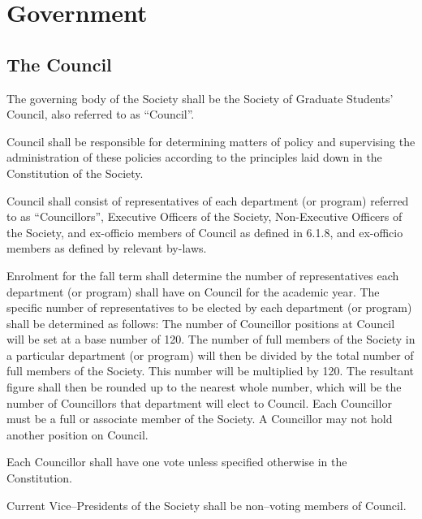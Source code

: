 \newpage

\section{Government}
\subsection{The Council}
	\begin{longenum}[label*=\thesubsection.\arabic*., align=left]
	\item The governing body of the Society shall be the Society of Graduate Students' Council, also referred to as ``Council''.
    \item Council shall be responsible for determining matters of policy and supervising the administration of these policies according to the principles laid down in the Constitution of the Society.
    \item Council shall consist of representatives of each department (or program) referred to as ``Councillors'', Executive Officers of the Society, Non-Executive Officers of the Society, and ex-officio members of Council as defined in 6.1.8, and ex-officio members as defined by relevant by-laws. 
    \item Enrolment for the fall term shall determine the number of representatives each department (or program) shall have on Council for the academic year. The specific number of representatives to be elected by each department (or program) shall be determined as follows: The number of Councillor positions at Council will be set at a base number of 120. The number of full members of the Society in a particular department (or program) will then be divided by the total number of full members of the Society. This number will be multiplied by 120. The resultant figure shall then be rounded up to the nearest whole number, which will be the number of Councillors that department will elect to Council. Each Councillor must be a full or associate member of the Society. A Councillor may not hold another position on Council. 
    \item Each Councillor shall have one vote unless specified otherwise in the Constitution. 
    \item Current Vice--Presidents of the Society shall be non--voting members of Council. 

\end{longenum}
